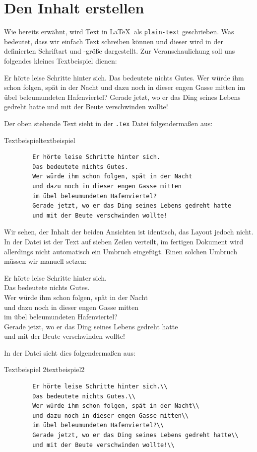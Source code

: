\section{Den Inhalt erstellen}

Wie bereits erwähnt, wird Text in \LaTeX~als \texttt{plain-text} geschrieben.
Was bedeutet, dass wir einfach Text schreiben können und dieser wird in der
definierten Schriftart und -größe dargestellt. Zur Veranschaulichung soll uns
folgendes kleines Textbeispiel dienen:

Er hörte leise Schritte hinter sich.
Das bedeutete nichts Gutes.
Wer würde ihm schon folgen, spät in der Nacht
und dazu noch in dieser engen Gasse mitten
im übel beleumundeten Hafenviertel?
Gerade jetzt, wo er das Ding seines Lebens gedreht hatte
und mit der Beute verschwinden wollte!

Der oben stehende Text sieht in der \texttt{.tex} Datei folgendermaßen aus:
\enlargethispage{4\baselineskip}
\begin{code}{Textbeispiel}{textbeispiel}
	\begin{verbatim}
		Er hörte leise Schritte hinter sich. 
		Das bedeutete nichts Gutes. 
		Wer würde ihm schon folgen, spät in der Nacht 
		und dazu noch in dieser engen Gasse mitten 
		im übel beleumundeten Hafenviertel? 
		Gerade jetzt, wo er das Ding seines Lebens gedreht hatte 
		und mit der Beute verschwinden wollte! 
	\end{verbatim}
\end{code}
Wir sehen, der Inhalt der beiden Ansichten ist identisch, das Layout jedoch
nicht. In der Datei ist der Text auf sieben Zeilen verteilt, im fertigen
Dokument wird allerdings nicht automatisch ein Umbruch eingefügt. Einen solchen
Umbruch müssen wir manuell setzen:

Er hörte leise Schritte hinter sich.\\
Das bedeutete nichts Gutes.\\
Wer würde ihm schon folgen, spät in der Nacht\\
und dazu noch in dieser engen Gasse mitten\\
im übel beleumundeten Hafenviertel?\\
Gerade jetzt, wo er das Ding seines Lebens gedreht hatte\\
und mit der Beute verschwinden wollte!

In der Datei sieht dies folgendermaßen aus:
\begin{code}{Textbeispiel 2}{textbeispiel2}
	\begin{verbatim}
		Er hörte leise Schritte hinter sich.\\ 
		Das bedeutete nichts Gutes.\\
		Wer würde ihm schon folgen, spät in der Nacht\\ 
		und dazu noch in dieser engen Gasse mitten\\ 
		im übel beleumundeten Hafenviertel?\\ 
		Gerade jetzt, wo er das Ding seines Lebens gedreht hatte\\
		und mit der Beute verschwinden wollte!\\ 
	\end{verbatim}
\end{code}

